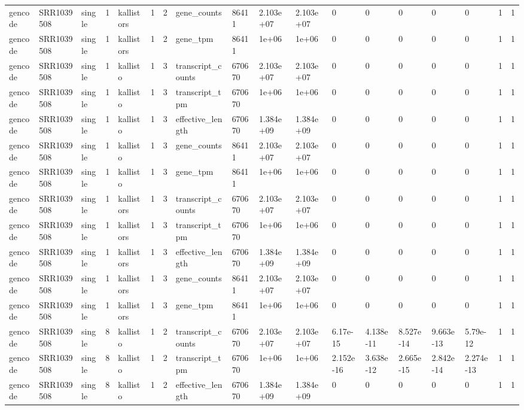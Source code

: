 \begin{tabular}{llllllllllllllllll}
gencode & SRR1039508 & single & 1 & kallistors & 1 & 2 & gene\_counts & 86411 & 2.103e+07 & 2.103e+07 & 0 & 0 & 0 & 0 & 0 & 1 & 1 \\
gencode & SRR1039508 & single & 1 & kallistors & 1 & 2 & gene\_tpm & 86411 & 1e+06 & 1e+06 & 0 & 0 & 0 & 0 & 0 & 1 & 1 \\
gencode & SRR1039508 & single & 1 & kallisto & 1 & 3 & transcript\_counts & 670670 & 2.103e+07 & 2.103e+07 & 0 & 0 & 0 & 0 & 0 & 1 & 1 \\
gencode & SRR1039508 & single & 1 & kallisto & 1 & 3 & transcript\_tpm & 670670 & 1e+06 & 1e+06 & 0 & 0 & 0 & 0 & 0 & 1 & 1 \\
gencode & SRR1039508 & single & 1 & kallisto & 1 & 3 & effective\_length & 670670 & 1.384e+09 & 1.384e+09 & 0 & 0 & 0 & 0 & 0 & 1 & 1 \\
gencode & SRR1039508 & single & 1 & kallisto & 1 & 3 & gene\_counts & 86411 & 2.103e+07 & 2.103e+07 & 0 & 0 & 0 & 0 & 0 & 1 & 1 \\
gencode & SRR1039508 & single & 1 & kallisto & 1 & 3 & gene\_tpm & 86411 & 1e+06 & 1e+06 & 0 & 0 & 0 & 0 & 0 & 1 & 1 \\
gencode & SRR1039508 & single & 1 & kallistors & 1 & 3 & transcript\_counts & 670670 & 2.103e+07 & 2.103e+07 & 0 & 0 & 0 & 0 & 0 & 1 & 1 \\
gencode & SRR1039508 & single & 1 & kallistors & 1 & 3 & transcript\_tpm & 670670 & 1e+06 & 1e+06 & 0 & 0 & 0 & 0 & 0 & 1 & 1 \\
gencode & SRR1039508 & single & 1 & kallistors & 1 & 3 & effective\_length & 670670 & 1.384e+09 & 1.384e+09 & 0 & 0 & 0 & 0 & 0 & 1 & 1 \\
gencode & SRR1039508 & single & 1 & kallistors & 1 & 3 & gene\_counts & 86411 & 2.103e+07 & 2.103e+07 & 0 & 0 & 0 & 0 & 0 & 1 & 1 \\
gencode & SRR1039508 & single & 1 & kallistors & 1 & 3 & gene\_tpm & 86411 & 1e+06 & 1e+06 & 0 & 0 & 0 & 0 & 0 & 1 & 1 \\
gencode & SRR1039508 & single & 8 & kallisto & 1 & 2 & transcript\_counts & 670670 & 2.103e+07 & 2.103e+07 & 6.17e-15 & 4.138e-11 & 8.527e-14 & 9.663e-13 & 5.79e-12 & 1 & 1 \\
gencode & SRR1039508 & single & 8 & kallisto & 1 & 2 & transcript\_tpm & 670670 & 1e+06 & 1e+06 & 2.152e-16 & 3.638e-12 & 2.665e-15 & 2.842e-14 & 2.274e-13 & 1 & 1 \\
gencode & SRR1039508 & single & 8 & kallisto & 1 & 2 & effective\_length & 670670 & 1.384e+09 & 1.384e+09 & 0 & 0 & 0 & 0 & 0 & 1 & 1 \\

\end{tabular}
